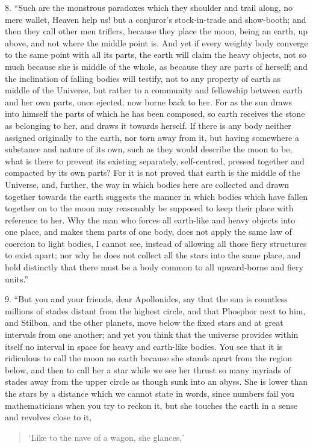 \documentclass[a4paper, 11pt, oneside, polutonikogreek, english]{article}
\begin{document}
8. ``Such are the monstrous paradoxes which they shoulder and trail along, no mere wallet, Heaven help us! but a conjuror's stock-in-trade and show-booth; and then they call other men triflers, because they place the moon, being an earth, up above, and not where the middle point is. And yet if every weighty body converge to the same point with all its parts, the earth will claim the heavy objects, not so much because she is middle of the whole, as because they are parts of herself; and the inclination of falling bodies will testify, not to any property of earth as middle of the Universe, but rather to a community and fellowship between earth and her own parts, once ejected, now borne back to her. For as the sun draws into himself the parts of which he has been composed, so earth receives the stone as belonging to her, and draws it towards herself. If there is any body neither assigned originally to the earth, nor torn away from it, but having somewhere a substance and nature of its own, such as they would describe the moon to be, what is there to prevent its existing separately, self-centred, pressed together and compacted by its own parts? For it is not proved that earth is the middle of the Universe, and, further, the way in which bodies here are collected and drawn together towards the earth suggests the manner in which bodies which have fallen together on to the moon may reasonably be supposed to keep their place with reference to her. Why the man who forces all earth-like and heavy objects into one place, and makes them parts of one body, does not apply the same law of coercion to light bodies, I cannot see, instead of allowing all those fiery structures to exist apart; nor why he does not collect all the stars into the same place, and hold distinctly that there must be a body common to all upward-borne and fiery units.''

9. ``But you and your friends, dear Apollonides, say that the sun is countless millions of stades distant from the highest circle, and that Phosphor next to him, and Stilbon, and the other planets, move below the fixed stars and at great intervals from one another; and yet you think that the universe provides within itself no interval in space for heavy and earth-like bodies. You see that it is ridiculous to call the moon no earth because she stands apart from the region below, and then to call her a star while we see her thrust so many myriads of stades away from the upper circle as though sunk into an abyss. She is lower than the stars by a distance which we cannot state in words, since numbers fail you mathematicians when you try to reckon it, but she touches the earth in a sense and revolves close to it,
\begin{quotation}
`Like to the nave of a wagon, she glances,'
\end{quotation}
\end{document}
